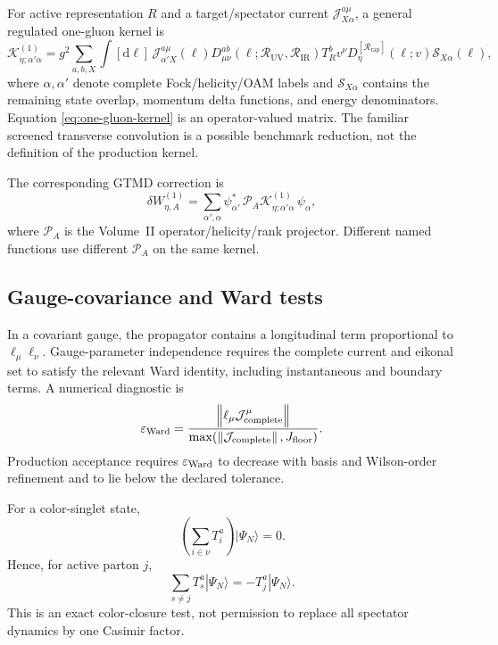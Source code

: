 \documentclass[11pt]{article}
\newcommand{\dd}{\mathrm{d}}
\newcommand{\cR}{\mathcal R}
\newcommand{\cS}{\mathcal S}
\newcommand{\cK}{\mathcal K}
\newcommand{\cP}{\mathcal P}
\newcommand{\cJ}{\mathcal J}
\newcommand{\eps}{\varepsilon}
\newcommand{\norm}[1]{\left\lVert#1\right\rVert}
\newcommand{\rap}{\mathrm{rap}}
\newcommand{\UV}{\mathrm{UV}}
\newcommand{\IR}{\mathrm{IR}}
\begin{document}
For active representation \(R\) and a target/spectator current
\(\cJ_{X\alpha}^{a\mu}\), a general regulated one-gluon kernel is
\begin{equation}
 \cK_{\eta;\alpha'\alpha}^{(1)}
 =g^2\sum_{a,b,X}\int[\dd\ell]\,
 \cJ_{\alpha'X}^{a\mu}(\ell)
 D_{\mu\nu}^{ab}(\ell;\cR_{\UV},\cR_{\IR})
 T_R^b v^\nu
 D_{\eta}^{[\cR_{\rap}]}(\ell;v)
 \cS_{X\alpha}(\ell),
\label{eq:one-gluon-kernel}
\end{equation}
where \(\alpha,\alpha'\) denote complete Fock/helicity/OAM labels and
\(\cS_{X\alpha}\) contains the remaining state overlap, momentum delta
functions, and energy denominators.  Equation \eqref{eq:one-gluon-kernel} is
an operator-valued matrix.  The familiar screened transverse convolution is a
possible benchmark reduction, not the definition of the production kernel.

The corresponding GTMD correction is
\begin{equation}
 \delta W_{\eta,A}^{(1)}
 =\sum_{\alpha',\alpha}
 \psi_{\alpha'}^*\,
 \cP_A\cK_{\eta;\alpha'\alpha}^{(1)}\,
 \psi_{\alpha},
\label{eq:gtmd-kernel-correction}
\end{equation}
where \(\cP_A\) is the Volume~II operator/helicity/rank projector.  Different
named functions use different \(\cP_A\) on the same kernel.

\subsection{Gauge-covariance and Ward tests}

In a covariant gauge, the propagator contains a longitudinal term
proportional to \(\ell_\mu\ell_\nu\).  Gauge-parameter independence requires
the complete current and eikonal set to satisfy the relevant Ward identity,
including instantaneous and boundary terms.  A numerical diagnostic is
\begin{equation}
 \eps_{\rm Ward}
 =\frac{\norm{\ell_\mu\cJ^\mu_{\rm complete}}}
 {\max(\norm{\cJ_{\rm complete}},J_{\rm floor})}.
\label{eq:ward-residual}
\end{equation}
Production acceptance requires \(\eps_{\rm Ward}\) to decrease with basis and
Wilson-order refinement and to lie below the declared tolerance.

For a color-singlet state,
\begin{equation}
 \left(\sum_{i\in\nu}T_i^a\right)|\Psi_N\rangle=0.
\label{eq:color-singlet-charge}
\end{equation}
Hence, for active parton \(j\),
\begin{equation}
 \sum_{s\neq j}T_s^a|\Psi_N\rangle
 =-T_j^a|\Psi_N\rangle.
\label{eq:spectator-color-closure}
\end{equation}
This is an exact color-closure test, not permission to replace all spectator
dynamics by one Casimir factor.
\end{document}
